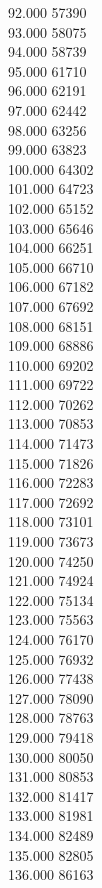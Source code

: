 { 92.000	57390 \\
 93.000	58075 \\
 94.000	58739 \\
 95.000	61710 \\
 96.000	62191 \\
 97.000	62442 \\
 98.000	63256 \\
 99.000	63823 \\
 100.000	64302 \\
 101.000	64723 \\
 102.000	65152 \\
 103.000	65646 \\
 104.000	66251 \\
 105.000	66710 \\
 106.000	67182 \\
 107.000	67692 \\
 108.000	68151 \\
 109.000	68886 \\
 110.000	69202 \\
 111.000	69722 \\
 112.000	70262 \\
 113.000	70853 \\
 114.000	71473 \\
 115.000	71826 \\
 116.000	72283 \\
 117.000	72692 \\
 118.000	73101 \\
 119.000	73673 \\
 120.000	74250 \\
 121.000	74924 \\
 122.000	75134 \\
 123.000	75563 \\
 124.000	76170 \\
 125.000	76932 \\
 126.000	77438 \\
 127.000	78090 \\
 128.000	78763 \\
 129.000	79418 \\
 130.000	80050 \\
 131.000	80853 \\
 132.000	81417 \\
 133.000	81981 \\
 134.000	82489 \\
 135.000	82805 \\
 136.000	86163 \\
}
